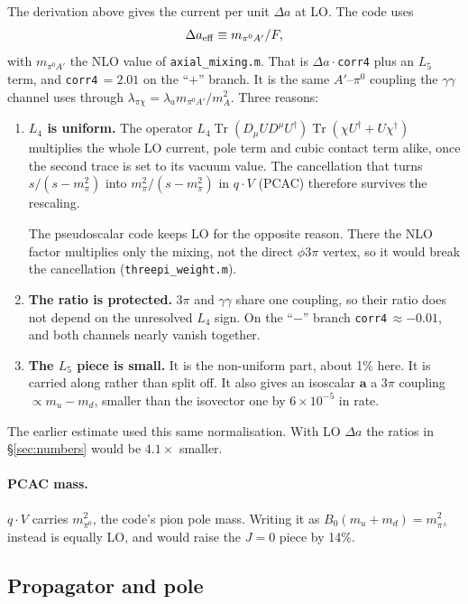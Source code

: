 \documentclass{article}
\newcommand{\tr}{\operatorname{Tr}}
\newcommand{\mpi}{m_\pi}
\newcommand{\Da}{\Delta a}
\begin{document}
The derivation above gives the current per unit $\Da$ at LO. The code uses
\begin{equation}
  \Da_{\rm eff}\equiv m_{\pi^0A'}/F ,
\end{equation}
with $m_{\pi^0A'}$ the NLO value of \texttt{axial\_mixing.m}. That is
$\Da\cdot$\texttt{corr4} plus an $L_5$ term, and \texttt{corr4}$\,=2.01$ on the ``$+$'' branch. It
is the same $A'$--$\pi^0$ coupling the $\gamma\gamma$ channel uses through
$\lambda_{\pi\chi}=\lambda_am_{\pi^0A'}/m_A^2$. Three reasons:
\begin{enumerate}
\item \textbf{$L_4$ is uniform.} The operator
  $L_4\tr(D_\mu UD^\mu U^\dagger)\tr(\chi U^\dagger+U\chi^\dagger)$ multiplies the whole LO
  current, pole term and cubic contact term alike, once the second trace is set to its vacuum
  value. The cancellation that turns $s/(s-\mpi^2)$ into $\mpi^2/(s-\mpi^2)$ in $q\cdot V$ (PCAC)
  therefore survives the rescaling.

  The pseudoscalar code keeps LO for the opposite reason. There the NLO factor multiplies only the
  mixing, not the direct $\phi3\pi$ vertex, so it would break the cancellation
  (\texttt{threepi\_weight.m}).
\item \textbf{The ratio is protected.} $3\pi$ and $\gamma\gamma$ share one coupling, so their ratio
  does not depend on the unresolved $L_4$ sign. On the ``$-$'' branch \texttt{corr4}$\,\approx-0.01$,
  and both channels nearly vanish together.
\item \textbf{The $L_5$ piece is small.} It is the non-uniform part, about 1\% here. It is carried
  along rather than split off. It also gives an isoscalar $\mathbf a$ a $3\pi$ coupling
  $\propto m_u-m_d$, smaller than the isovector one by $6\times10^{-5}$ in rate.
\end{enumerate}
The earlier estimate used this same normalisation. With LO $\Da$ the ratios in \S\ref{sec:numbers}
would be $4.1\times$ smaller.

\paragraph{PCAC mass.}
$q\cdot V$ carries $m_{\pi^0}^2$, the code's pion pole mass. Writing it as $B_0(m_u+m_d)=m_{\pi^\pm}^2$
instead is equally LO, and would raise the $J=0$ piece by 14\%.

\subsection{Propagator and pole}
\end{document}
